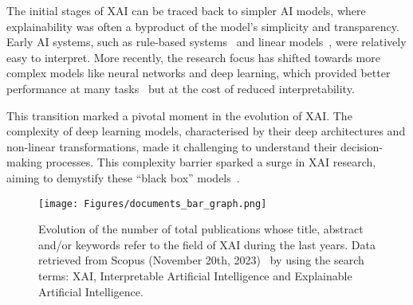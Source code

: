 The initial stages of XAI can be traced back to simpler AI models, where explainability was often a byproduct of the model's simplicity and transparency. Early AI systems, such as rule-based systems~\cite{hayes1985rule} and linear models~\cite{searle1997linear}, were relatively easy to interpret. More recently, the research focus has shifted towards more complex models like neural networks and deep learning, which provided better performance at many tasks~\cite{de2010combining,varadi2022alphafold,kuutti2020survey,cavalcante2016computational,huang2020artificial} but at the cost of reduced interpretability.

This transition marked a pivotal moment in the evolution of XAI. The complexity of deep learning models, characterised by their deep architectures and non-linear transformations, made it challenging to understand their decision-making processes. This complexity barrier sparked a surge in XAI research, aiming to demystify these ``black box'' models~\cite{VandewieleJOTH16, BastaniKB17a, ZhangWZ18a, NguyenYC16, SabourFH17, LinsleySES19, ShiXXCLLG21, SimonyanVZ13, SpringenbergDBR14, Ribeiro0G16, LundbergL17, ElenbergDFK17, Ribeiro0G18, ShrikumarGK17, SundararajanTY17, SmilkovTKVW17, ChattopadhyaySH18, bach2015pixel}.

\begin{figure}[ht!]
\begin{center}
\texttt{[image: Figures/documents\_bar\_graph.png]}
\end{center}
\caption{Evolution of the number of total publications whose title, abstract and/or keywords refer to the field of XAI during the last years. Data retrieved from Scopus (November 20th, 2023)~\cite{Scopus} by using the search terms: XAI, Interpretable Artificial Intelligence and Explainable Artificial Intelligence.}
\label{Fig:XAI}
\end{figure} 

